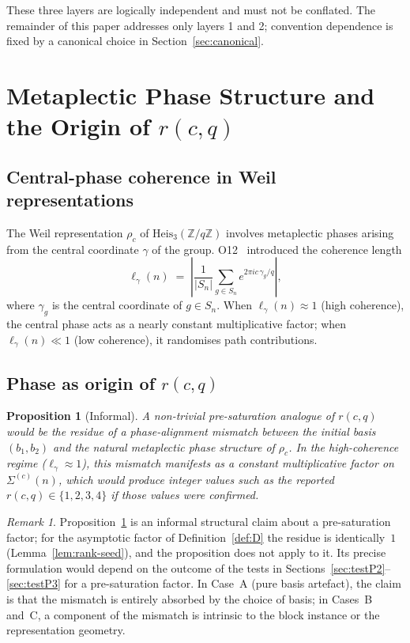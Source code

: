 \documentclass[11pt,a4paper]{article}
\newtheorem{proposition}[theorem]{Proposition}
\theoremstyle{remark}
\newtheorem{remark}[theorem]{Remark}
\newcommand{\rcq}{r(c,q)}
\newcommand{\Heis}{\mathrm{Heis}_{3}(\mathbb{Z}/q\mathbb{Z})}
\newcommand{\ellgam}{\ell_{\gamma}}
\begin{document}
    \noindent
    These three layers are logically independent and must not be conflated.
    The remainder of this paper addresses only layers 1 and 2; convention
    dependence is fixed by a canonical choice in Section~\ref{sec:canonical}.

  \section{Metaplectic Phase Structure and the Origin of $r(c,q)$}
  \label{sec:phase}

  \subsection{Central-phase coherence in Weil representations}

    The Weil representation $\rho_{c}$ of $\Heis$ involves metaplectic phases
    arising from the central coordinate $\gamma$ of the group.
    O12~\cite{Beau2026a16} introduced the coherence length
    \[
      \ellgam(n)
      \;=\;
      \left|
        \frac{1}{|S_{n}|}\sum_{g \in S_{n}} e^{2\pi i c\,\gamma_{g}/q}
      \right|,
    \]
    where $\gamma_{g}$ is the central coordinate of $g \in S_{n}$.
    When $\ellgam(n) \approx 1$ (high coherence), the central phase acts as a
    nearly constant multiplicative factor; when $\ellgam(n) \ll 1$ (low
    coherence), it randomises path contributions.

  \subsection{Phase as origin of $r(c,q)$}

    \begin{proposition}[Informal]
      \label{prop:phase-heuristic}
      A non-trivial pre-saturation analogue of $\rcq$ would be the residue of a phase-alignment
      mismatch between the initial basis $(b_{1}, b_{2})$ and the natural
      metaplectic phase structure of $\rho_{c}$.
      In the high-coherence regime ($\ellgam \approx 1$), this mismatch manifests
      as a constant multiplicative factor on $\Sigma^{(c)}(n)$, which would produce
      integer values such as the reported $\rcq \in \{1, 2, 3, 4\}$ if those values were
      confirmed.
    \end{proposition}

    \begin{remark}
      Proposition~\ref{prop:phase-heuristic} is an informal structural claim about a pre-saturation
      factor; for the asymptotic factor of Definition~\ref{def:D} the residue is identically~$1$
      (Lemma~\ref{lem:rank-seed}), and the proposition does not apply to it.
      Its precise formulation would depend on the outcome of the tests in
      Sections~\ref{sec:testP2}--\ref{sec:testP3} for a pre-saturation factor.
      In Case~A (pure basis artefact), the claim is that the mismatch is entirely
      absorbed by the choice of basis; in Cases~B and~C, a component of the
      mismatch is intrinsic to the block instance or the representation geometry.
    \end{remark}
\end{document}
